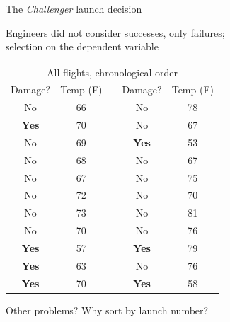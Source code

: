 \documentclass[11pt]{beamer}
\begin{document}
\begin{frame}{The \textit{Challenger} launch decision}
\begin{small}


Engineers did not consider successes, only failures; \\
selection on the dependent variable \pause

\begin{scriptsize}
\begin{center}
\begin{tabular}{ccccc}
\toprule
\multicolumn{5}{c}{All flights, chronological order}\\
Damage? &       Temp (F)        &      \quad \quad \quad        &       Damage? &       Temp (F)        \\
\midrule
No      &       66      &               &       No      &       78      \\
\color{red}\textbf{Yes}    &     \color{red}  70      &               &       No      &       67      \\
No      &       69      &               &     \color{red}   \textbf{Yes}    & \color{red}       53      \\
No      &       68      &               &       No      &       67      \\
No      &       67      &               &       No      &       75      \\
No      &       72      &               &       No      &       70      \\
No      &       73      &               &       No      &       81      \\
No      &       70      &               &       No      &       76      \\
\color{red} \textbf{Yes}    &   \color{red}     57      &               &       \color{red} \textbf{Yes}    &   \color{red}     79      \\
\color{red} \textbf{Yes}    &   \color{red}     63      &               &       No      &       76      \\
\color{red} \textbf{Yes}    &   \color{red}     70      &               &       \color{red} \textbf{Yes}    &   \color{red}     58      \\
\bottomrule
\end{tabular}
\end{center}
\end{scriptsize}
Other problems?  \pause Why sort by launch number?

\end{small}
\end{frame}
\end{document}
